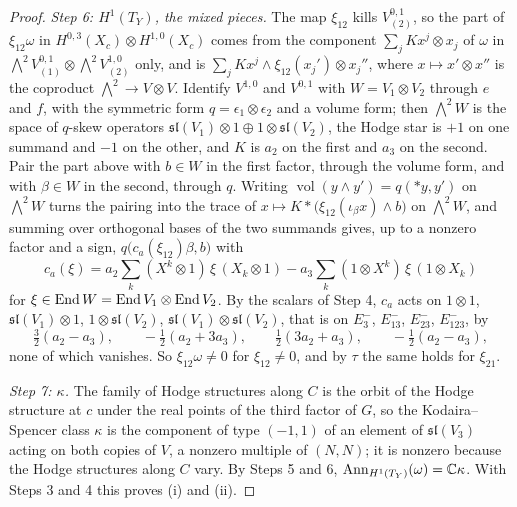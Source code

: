 \begin{proof}
\emph{Step 6: $H^{1}(T_{Y})$, the mixed pieces.} The map $\xi_{12}$ kills
$V^{0,1}_{(2)}$, so the part of $\xi_{12}\omega$ in $H^{0,3}(X_{c})\otimes
H^{1,0}(X_{c})$ comes from the component $\sum_{j}Kx^{j}\otimes x_{j}$ of
$\omega$ in ${\textstyle\bigwedge^{2}}V^{0,1}_{(1)}\otimes{\textstyle\bigwedge^{2}}
V^{1,0}_{(2)}$ only, and is $\sum_{j}Kx^{j}\wedge\xi_{12}(x_{j}')\otimes
x_{j}''$, where $x\mapsto x'\otimes x''$ is the coproduct
${\textstyle\bigwedge^{2}}\to V\otimes V$. Identify $V^{1,0}$ and $V^{0,1}$
with $W=V_{1}\otimes V_{2}$ through $e$ and $f$, with the symmetric form
$q=\epsilon_{1}\otimes\epsilon_{2}$ and a volume form; then
${\textstyle\bigwedge^{2}}W$ is the space of $q$-skew operators
$\mathfrak{sl}(V_{1})\otimes1\oplus1\otimes\mathfrak{sl}(V_{2})$, the Hodge
star is $+1$ on one summand and $-1$ on the other, and $K$ is $a_{2}$ on the
first and $a_{3}$ on the second. Pair the part above with $b\in W$ in the
first factor, through the volume form, and with $\beta\in W$ in the second,
through $q$. Writing $\operatorname{vol}(y\wedge y')=q(\ast y,y')$ on
${\textstyle\bigwedge^{2}}W$ turns the pairing into the trace of
$x\mapsto K\ast\bigl(\xi_{12}(\iota_{\beta}x)\wedge b\bigr)$ on
${\textstyle\bigwedge^{2}}W$, and summing over orthogonal bases of the two
summands gives, up to a nonzero factor and a sign,
$q\bigl(c_{a}(\xi_{12})\beta,b\bigr)$ with
\[
  c_{a}(\xi)=a_{2}\sum_{k}(X^{k}\otimes1)\,\xi\,(X_{k}\otimes1)
  -a_{3}\sum_{k}(1\otimes X^{k})\,\xi\,(1\otimes X_{k})
\]
for $\xi\in\operatorname{End} W=\operatorname{End} V_{1}\otimes\operatorname{End} V_{2}$.
By the scalars of Step 4, $c_{a}$ acts on $1\otimes1$, $\mathfrak{sl}(V_{1})
\otimes1$, $1\otimes\mathfrak{sl}(V_{2})$, $\mathfrak{sl}(V_{1})\otimes
\mathfrak{sl}(V_{2})$, that is on $E_{3}^{-}$, $E_{13}^{-}$, $E_{23}^{-}$,
$E_{123}^{-}$, by
\[
  \tfrac32(a_{2}-a_{3}),\qquad
  -\tfrac12(a_{2}+3a_{3}),\qquad
  \tfrac12(3a_{2}+a_{3}),\qquad
  -\tfrac12(a_{2}-a_{3}),
\]
none of which vanishes. So $\xi_{12}\omega\ne0$ for $\xi_{12}\ne0$, and by
$\tau$ the same holds for $\xi_{21}$.

\emph{Step 7: $\kappa$.} The family of Hodge structures along $C$ is the
orbit of the Hodge structure at $c$ under the real points of the third factor
of $G$, so the Kodaira--Spencer class $\kappa$ is the component of type
$(-1,1)$ of an element of $\mathfrak{sl}(V_{3})$ acting on both copies of $V$,
a nonzero multiple of $(N,N)$; it is nonzero because the Hodge structures
along $C$ vary. By Steps 5 and 6, $\operatorname{Ann}_{H^{1}(T_{Y})}(\omega)=\mathbb{C}\kappa$.
With Steps 3 and 4 this proves (i) and (ii).


\end{proof}
